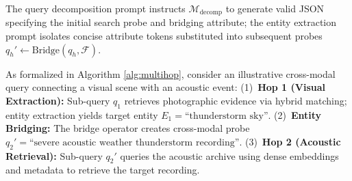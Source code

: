 \documentclass[conference]{IEEEtran}
\begin{document}
The query decomposition prompt instructs $\mathcal{M}_{\text{decomp}}$ to generate valid JSON specifying the initial search probe and bridging attribute; the entity extraction prompt isolates concise attribute tokens substituted into subsequent probes $q_h' \leftarrow \text{Bridge}(q_h, \mathcal{F})$.

As formalized in Algorithm \ref{alg:multihop}, consider an illustrative cross-modal query connecting a visual scene with an acoustic event: (1)~\textbf{Hop 1 (Visual Extraction):} Sub-query $q_1$ retrieves photographic evidence via hybrid matching; entity extraction yields target entity $E_1 = \text{``thunderstorm sky''}$. (2)~\textbf{Entity Bridging:} The bridge operator creates cross-modal probe $q_2' = \text{``severe acoustic weather thunderstorm recording''}$. (3)~\textbf{Hop 2 (Acoustic Retrieval):} Sub-query $q_2'$ queries the acoustic archive using dense embeddings and metadata to retrieve the target recording.
\end{document}
